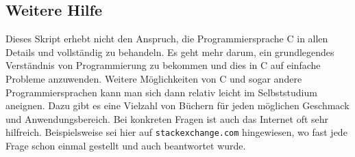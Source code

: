 \subsection{Weitere Hilfe}

Dieses Skript erhebt nicht den Anspruch, die Programmiersprache C in allen Details und vollständig zu behandeln.
Es geht mehr darum, ein grundlegendes Verständnis von Programmierung zu bekommen und dies in C auf einfache Probleme anzuwenden.
Weitere Möglichkeiten von C und sogar andere Programmiersprachen kann man sich dann relativ leicht im Selbststudium aneignen.
Dazu gibt es eine Vielzahl von Büchern für jeden möglichen Geschmack und Anwendungsbereich.
Bei konkreten Fragen ist auch das Internet oft sehr hilfreich.
Beispielsweise sei hier auf \texttt{stackexchange.com} hingewiesen, wo fast jede Frage schon einmal gestellt und auch beantwortet wurde.
